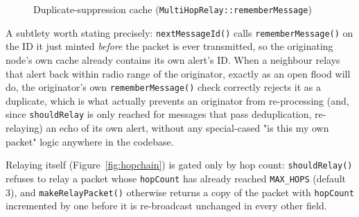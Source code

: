\documentclass[12pt,a4paper]{report}
\begin{document}
\begin{figure}[H]
\centering
{}
\caption{Duplicate-suppression cache (\texttt{MultiHopRelay::rememberMessage})}
\label{fig:dedupe}
\end{figure}

A subtlety worth stating precisely: \texttt{nextMessageId()} calls \texttt{rememberMessage()} on the ID it just minted \emph{before} the packet is ever transmitted, so the originating node's own cache already contains its own alert's ID. When a neighbour relays that alert back within radio range of the originator, exactly as an open flood will do, the originator's own \texttt{rememberMessage()} check correctly rejects it as a duplicate, which is what actually prevents an originator from re-processing (and, since \texttt{shouldRelay} is only reached for messages that pass deduplication, re-relaying) an echo of its own alert, without any special-cased "is this my own packet" logic anywhere in the codebase.

Relaying itself (Figure~\ref{fig:hopchain}) is gated only by hop count: \texttt{shouldRelay()} refuses to relay a packet whose \texttt{hopCount} has already reached \texttt{MAX\_HOPS} (default 3), and \texttt{makeRelayPacket()} otherwise returns a copy of the packet with \texttt{hopCount} incremented by one before it is re-broadcast unchanged in every other field.
\end{document}
